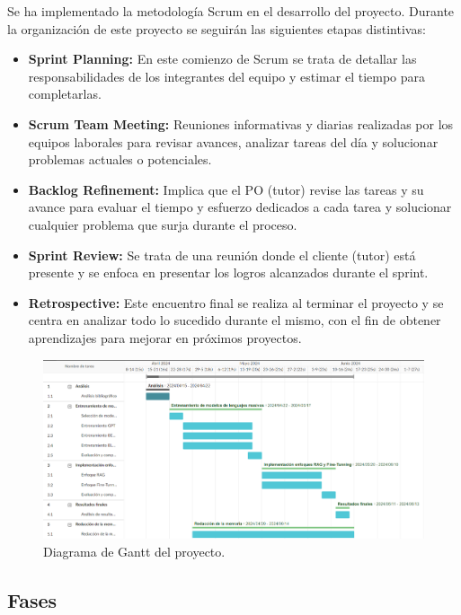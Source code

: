 Se ha implementado la metodología Scrum en el desarrollo del proyecto. Durante la organización de este proyecto se seguirán las siguientes etapas distintivas:
\begin{itemize}
\item \textbf{Sprint Planning:} En este comienzo de Scrum se trata de detallar las responsabilidades de los integrantes del equipo y estimar el tiempo para completarlas.
\item \textbf{Scrum Team Meeting:}  Reuniones informativas y diarias realizadas por los equipos laborales para revisar avances, analizar tareas del día y solucionar problemas actuales o potenciales.
\item \textbf{Backlog Refinement:} Implica que el \acrfull{PO} (tutor) revise las tareas y su avance para evaluar el tiempo y esfuerzo dedicados a cada tarea y solucionar cualquier problema que surja durante el proceso.
\item \textbf{Sprint Review:} Se trata de una reunión donde el cliente (tutor) está presente y se enfoca en presentar los logros alcanzados durante el sprint.
\item \textbf{Retrospective:} Este encuentro final se realiza al terminar el proyecto y se centra en analizar todo lo sucedido durante el mismo, con el fin de obtener aprendizajes para mejorar en próximos proyectos.
\end{itemize}

\begin{figure}[h]
  \centering
  \includegraphics[width=\linewidth,height=\textheight,keepaspectratio]{imaxes/3_DiagramaGantt.png}
  \caption{Diagrama de Gantt del proyecto.}
  \label{fig:3_DiagramaGantt}
\end{figure}


\subsection{Fases}

